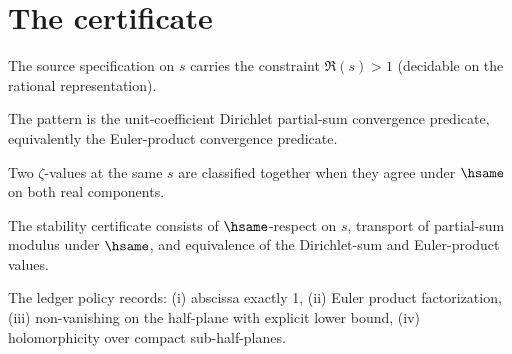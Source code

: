 \section{The certificate}

\begin{definition}
\label{def:zeta-basic-source-spec}
The source specification on \(s\) carries the constraint \(\Re(s) > 1\) (decidable on the rational representation).
\end{definition}

\begin{definition}
\label{def:zeta-basic-pattern-spec}
The pattern is the unit-coefficient Dirichlet partial-sum convergence predicate, equivalently the Euler-product convergence predicate.
\end{definition}

\begin{definition}
\label{def:zeta-basic-classifier-spec}
Two \(\zeta\)-values at the same \(s\) are classified together when they agree under \(\hsame\) on both real components.
\end{definition}

\begin{definition}
\label{def:zeta-basic-stability-cert}
The stability certificate consists of \(\hsame\)-respect on \(s\), transport of partial-sum modulus under \(\hsame\), and equivalence of the Dirichlet-sum and Euler-product values.
\end{definition}

\begin{definition}
\label{def:zeta-basic-ledger-policy}
The ledger policy records: (i) abscissa exactly 1, (ii) Euler product factorization, (iii) non-vanishing on the half-plane with explicit lower bound, (iv) holomorphicity over compact sub-half-planes.
\end{definition}

